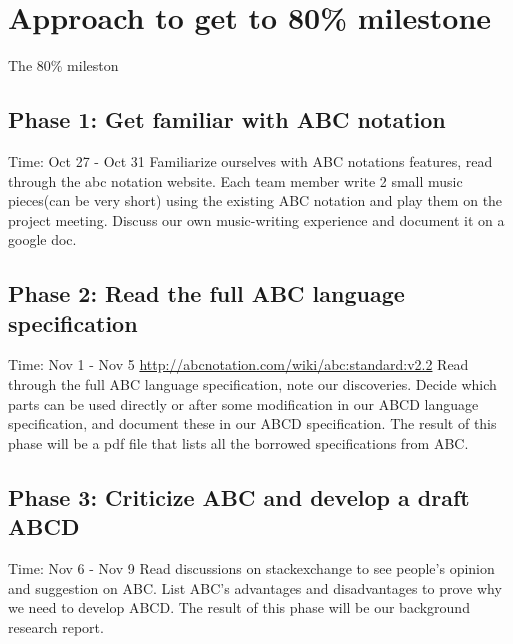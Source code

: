 \section{Approach to get to 80\% milestone}
The 80\% mileston

\subsection{Phase 1: Get familiar with ABC notation}
Time: Oct 27 - Oct 31
Familiarize ourselves with ABC notations features, read through the abc notation website. Each team member write 2 small music pieces(can be very short) using the existing ABC notation and play them on the project meeting. Discuss our own music-writing experience and document it on a google doc.

\subsection{Phase 2: Read the full ABC language specification}
Time: Nov 1 - Nov 5
\url{http://abcnotation.com/wiki/abc:standard:v2.2}
Read through the full ABC language specification, note our discoveries. Decide which parts can be used directly or after some modification in our ABCD language specification, and document these in our ABCD specification. The result of this phase will be a pdf file that lists all the borrowed specifications from ABC.

\subsection{Phase 3: Criticize ABC and develop a draft ABCD}
Time: Nov 6 - Nov 9
Read discussions on stackexchange to see people's opinion and suggestion on ABC. List ABC's advantages and disadvantages to prove why we need to develop ABCD. The result of this phase will be our background research report.

